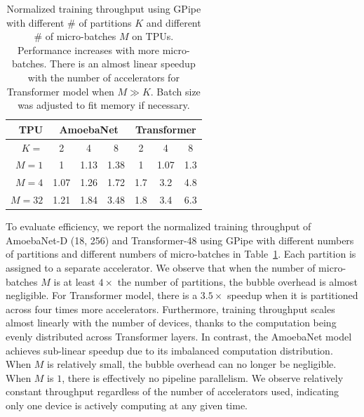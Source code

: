 \documentclass{article}
\def\codename{GPipe}
\begin{document}
\begin{table}
\begin{small}
\begin{center}
\caption{Normalized training throughput using \codename{} with different \# of partitions $K$ and different \# of micro-batches $M$ on TPUs.  Performance increases with more micro-batches. There is an almost linear speedup with the number of accelerators for Transformer model when $M \gg K$. Batch size was adjusted to fit memory if necessary.}
\label{results_performance_tab}
\begin{tabular}{rcccccc}
\toprule
 TPU & \multicolumn{3}{c}{AmoebaNet} & \multicolumn{3}{c}{Transformer}  \\
\midrule
 $K=$ & 2 & 4 & 8 & 2 & 4 & 8\\\hline
 $M=1$   & 1 & 1.13 & 1.38 & 1 & 1.07 & 1.3 \\
 $M=4$   & 1.07 & 1.26 & 1.72 & 1.7 & 3.2 & 4.8 \\
 $M=32$ & 1.21 & 1.84 & 3.48 &  1.8 & 3.4 & 6.3 \\
\bottomrule
\end{tabular}
\end{center}
\end{small}
\end{table}To evaluate efficiency, we report the normalized training throughput of AmoebaNet-D (18, 256) and Transformer-48 using \codename{} with different numbers of partitions and different numbers of micro-batches in Table~\ref{results_performance_tab}. Each partition is assigned to a separate accelerator.  We observe that when the number of micro-batches $M$ is at least $4\times$ the number of partitions, the bubble overhead is almost negligible. For Transformer model, there is a $3.5\times$ speedup when it is partitioned across four times more accelerators. Furthermore, training throughput scales almost linearly with the number of devices, thanks to the computation being evenly distributed across Transformer layers. In contrast, the AmoebaNet model achieves sub-linear speedup due to its imbalanced computation distribution. When $M$ is relatively small, the bubble overhead can no longer be negligible. When $M$ is $1$, there is effectively no pipeline parallelism. We observe relatively constant throughput regardless of the number of accelerators used, indicating only one device is actively computing at any given time.  
\end{document}
